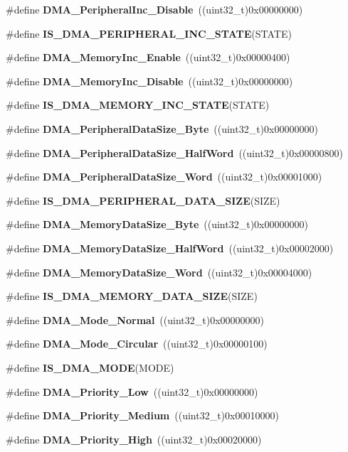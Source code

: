 \begin{DoxyCompactItemize}
\#define \textbf{ D\+M\+A\+\_\+\+Peripheral\+Inc\+\_\+\+Disable}~((uint32\+\_\+t)0x00000000)
\item 
\#define \textbf{ I\+S\+\_\+\+D\+M\+A\+\_\+\+P\+E\+R\+I\+P\+H\+E\+R\+A\+L\+\_\+\+I\+N\+C\+\_\+\+S\+T\+A\+TE}(S\+T\+A\+TE)
\item 
\#define \textbf{ D\+M\+A\+\_\+\+Memory\+Inc\+\_\+\+Enable}~((uint32\+\_\+t)0x00000400)
\item 
\#define \textbf{ D\+M\+A\+\_\+\+Memory\+Inc\+\_\+\+Disable}~((uint32\+\_\+t)0x00000000)
\item 
\#define \textbf{ I\+S\+\_\+\+D\+M\+A\+\_\+\+M\+E\+M\+O\+R\+Y\+\_\+\+I\+N\+C\+\_\+\+S\+T\+A\+TE}(S\+T\+A\+TE)
\item 
\#define \textbf{ D\+M\+A\+\_\+\+Peripheral\+Data\+Size\+\_\+\+Byte}~((uint32\+\_\+t)0x00000000)
\item 
\#define \textbf{ D\+M\+A\+\_\+\+Peripheral\+Data\+Size\+\_\+\+Half\+Word}~((uint32\+\_\+t)0x00000800)
\item 
\#define \textbf{ D\+M\+A\+\_\+\+Peripheral\+Data\+Size\+\_\+\+Word}~((uint32\+\_\+t)0x00001000)
\item 
\#define \textbf{ I\+S\+\_\+\+D\+M\+A\+\_\+\+P\+E\+R\+I\+P\+H\+E\+R\+A\+L\+\_\+\+D\+A\+T\+A\+\_\+\+S\+I\+ZE}(S\+I\+ZE)
\item 
\#define \textbf{ D\+M\+A\+\_\+\+Memory\+Data\+Size\+\_\+\+Byte}~((uint32\+\_\+t)0x00000000)
\item 
\#define \textbf{ D\+M\+A\+\_\+\+Memory\+Data\+Size\+\_\+\+Half\+Word}~((uint32\+\_\+t)0x00002000)
\item 
\#define \textbf{ D\+M\+A\+\_\+\+Memory\+Data\+Size\+\_\+\+Word}~((uint32\+\_\+t)0x00004000)
\item 
\#define \textbf{ I\+S\+\_\+\+D\+M\+A\+\_\+\+M\+E\+M\+O\+R\+Y\+\_\+\+D\+A\+T\+A\+\_\+\+S\+I\+ZE}(S\+I\+ZE)
\item 
\#define \textbf{ D\+M\+A\+\_\+\+Mode\+\_\+\+Normal}~((uint32\+\_\+t)0x00000000)
\item 
\#define \textbf{ D\+M\+A\+\_\+\+Mode\+\_\+\+Circular}~((uint32\+\_\+t)0x00000100)
\item 
\#define \textbf{ I\+S\+\_\+\+D\+M\+A\+\_\+\+M\+O\+DE}(M\+O\+DE)
\item 
\#define \textbf{ D\+M\+A\+\_\+\+Priority\+\_\+\+Low}~((uint32\+\_\+t)0x00000000)
\item 
\#define \textbf{ D\+M\+A\+\_\+\+Priority\+\_\+\+Medium}~((uint32\+\_\+t)0x00010000)
\item 
\#define \textbf{ D\+M\+A\+\_\+\+Priority\+\_\+\+High}~((uint32\+\_\+t)0x00020000)

\end{DoxyCompactItemize}
